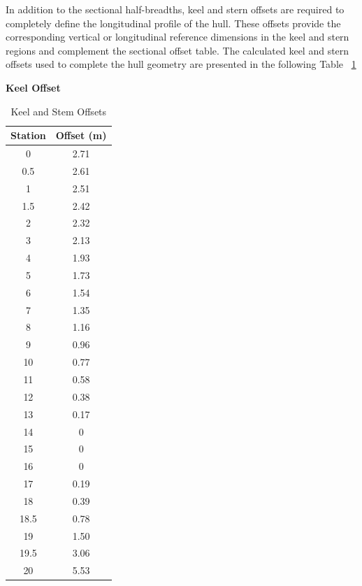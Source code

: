 \documentclass[12pt,a4paper,twoside]{report}
\begin{document}
\vspace{\baselineskip}\par\noindent In addition to the sectional half-breadths, keel and stern offsets are required to completely define the longitudinal profile of the hull. These offsets provide the corresponding vertical or longitudinal reference dimensions in the keel and stern regions and complement the sectional offset table. The calculated keel and stern offsets used to complete the hull geometry are presented in the following Table ~\ref{tab:keel_stem_offsets}
\begin{table}[H]
\centering
\caption{Keel and Stem Offsets}
\label{tab:keel_stem_offsets}

\begin{minipage}[t]{0.48\textwidth}
\centering
\textbf{Keel Offset}

\vspace{2mm}

\begin{tabular}{cc}
\toprule
\textbf{Station} & \textbf{Offset (m)} \\
\midrule
0    & 2.71 \\
0.5  & 2.61 \\
1    & 2.51 \\
1.5  & 2.42 \\
2    & 2.32 \\
3    & 2.13 \\
4    & 1.93 \\
5    & 1.73 \\
6    & 1.54 \\
7    & 1.35 \\
8    & 1.16 \\
9    & 0.96 \\
10   & 0.77 \\
11   & 0.58 \\
12   & 0.38 \\
13   & 0.17 \\
14   & 0 \\
15   & 0 \\
16   & 0 \\
17   & 0.19 \\
18   & 0.39 \\
18.5 & 0.78 \\
19   & 1.50 \\
19.5 & 3.06 \\
20   & 5.53 \\
\bottomrule
\end{tabular}


\end{minipage}
\end{table}
\end{document}
